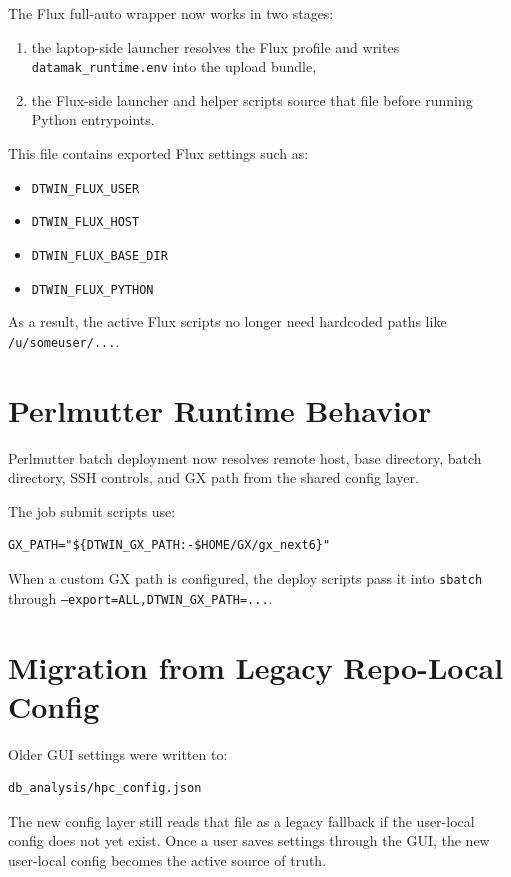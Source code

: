 \documentclass[11pt]{article}
\newcommand{\code}[1]{\texttt{#1}}
\begin{document}
The Flux full-auto wrapper now works in two stages:

\begin{enumerate}
\item the laptop-side launcher resolves the Flux profile and writes
\code{datamak\_runtime.env} into the upload bundle,
\item the Flux-side launcher and helper scripts source that file before running
Python entrypoints.
\end{enumerate}

This file contains exported Flux settings such as:

\begin{itemize}
\item \code{DTWIN\_FLUX\_USER}
\item \code{DTWIN\_FLUX\_HOST}
\item \code{DTWIN\_FLUX\_BASE\_DIR}
\item \code{DTWIN\_FLUX\_PYTHON}
\end{itemize}

As a result, the active Flux scripts no longer need hardcoded paths like
\code{/u/someuser/...}.

\section{Perlmutter Runtime Behavior}

Perlmutter batch deployment now resolves remote host, base directory, batch
directory, SSH controls, and GX path from the shared config layer.

The job submit scripts use:

\begin{verbatim}
GX_PATH="${DTWIN_GX_PATH:-$HOME/GX/gx_next6}"
\end{verbatim}

When a custom GX path is configured, the deploy scripts pass it into
\code{sbatch} through \code{--export=ALL,DTWIN\_GX\_PATH=...}.

\section{Migration from Legacy Repo-Local Config}

Older GUI settings were written to:

\begin{verbatim}
db_analysis/hpc_config.json
\end{verbatim}

The new config layer still reads that file as a legacy fallback if the
user-local config does not yet exist. Once a user saves settings through the
GUI, the new user-local config becomes the active source of truth.
\end{document}
